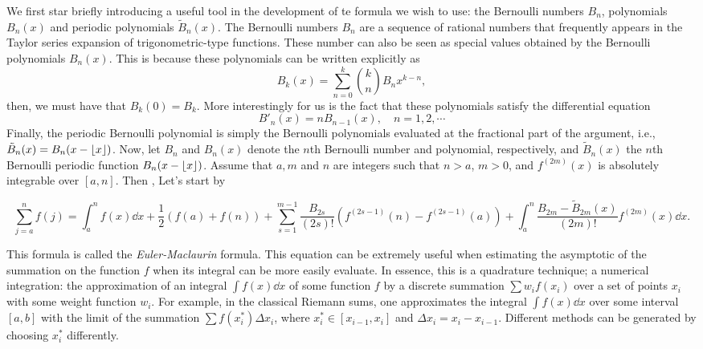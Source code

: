 We first star briefly introducing a useful tool in the development of te formula we wish to use: the Bernoulli numbers $B_n$, polynomials $B_n(x)$ and periodic polynomials $\tilde{B}_n(x)$. The Bernoulli numbers $B_n$ are a sequence of rational numbers that frequently appears in the Taylor series expansion of trigonometric-type functions. These number can also be seen as special values obtained by the Bernoulli polynomials $B_n(x)$. This is because these polynomials can be written explicitly as
\begin{equation}
	B_k(x) = \sum_{n=0}^{k} {k \choose n} B_n x^{k-n},
\end{equation}
then, we must have that $B_k(0) = B_k$. More interestingly for us is the fact that these polynomials satisfy the differential equation 
\begin{equation}
	B'_n(x) = n B_{n-1}(x), \quad n = 1,2,\cdots
	\label{Equation: Differential Bernoulli}
\end{equation}
Finally, the periodic Bernoulli polynomial is simply the Bernoulli polynomials evaluated at the fractional part of the argument, i.e., $\tilde{B}_n(x) = B_n(x - \lfloor x\rfloor)$. Now, let $B_n$ and $B_n(x)$ denote the $n$th Bernoulli number and polynomial, respectively, and $\tilde{B}_n(x)$ the $n$th Bernoulli periodic function $B_n(x - \lfloor x\rfloor)$. Assume that $a, m$ and $n$ are integers such that $n > a$, $m > 0$, and $f^{(2m)}(x)$ is absolutely integrable over $[a,n]$. Then \cite{NISTMathFunc}, Let's start by

\begin{equation}
	\sum_{j=a}^{n} f(j) = \int_{a}^{n} f(x) \dd x + \frac{1}{2} \left(f(a) + f(n)\right) + \sum_{s=1}^{m-1} \frac{B_{2s}}{(2s)!} \left( f^{(2s-1)}(n) - f^{(2s-1)}(a)\right) + \int_{a}^{n} \frac{B_{2m} - \tilde{B}_{2m}(x)}{(2m)!} f^{(2m)}(x) \dd x.
\end{equation}

This formula is called the \textit{Euler-Maclaurin} formula. This equation can be extremely useful when estimating the asymptotic of the summation on the function $f$ when its integral can be more easily evaluate. In essence, this is a quadrature technique; a numerical integration: the approximation of an integral $\int f(x) \dd x$ of some function $f$ by a discrete summation $\sum w_i f(x_i)$ over a set of points $x_i$ with some weight function $w_i$. For example, in the classical Riemann sums, one approximates the integral $\int f(x) \dd x$ over some interval $[a,b]$ with the limit of the summation $\sum f(x_i^*) \Delta x_i$, where $x_i^* \in [x_{i-1}, x_i]$ and $ \Delta x_i = x_i - x_{i-1}$. Different methods can be generated by choosing $x_i^*$ differently.

